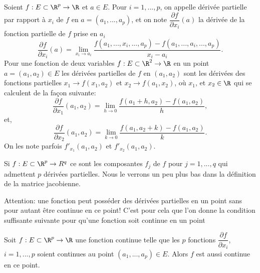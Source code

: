 \documentclass[class=report,crop=false]{standalone}
\begin{document}
\begin{definition}
\textcolor[rgb]{0.73,0.00,0.00}{
Soient $f: E \subset \R^p \rightarrow \R$ et $a \in E$. Pour $i=1,...,p$, 
on appelle dérivée partielle par rapport à $x_i$ de $f$ en $a=(a_1, ..., a_p)$, et on note
$\dfrac{\partial f}{\partial x_i}(a)$ la dérivée de la fonction partielle de $f$ prise en $a_i$
\begin{equation*}
\dfrac{\partial f}{ \partial x_i }(a)= \displaystyle \lim_{x_i \rightarrow a_i} \dfrac{f(a_1, ..., x_i,...,a_p)-f(a_1,...,a_i,...,a_p)}{x_i-a_i}.
\end{equation*}
Pour une fonction de deux variables $f:E \subset \R^2 \rightarrow \R$ en un point $a=(a_1,a_2) \in E$
les dérivées partielles de $f$ en $(a_1,a_2)$ sont les dérivées des fonctions partielles 
$x_1 \rightarrow f(x_1,a_2)$ et $x_2 \rightarrow f(a_1,x_2)$, où $x_1$, et $x_2 \in \R$ qui se calculent de la façon suivante:
\begin{equation*}
\dfrac{\partial f}{ \partial x_1 }(a_1,a_2)= \displaystyle \lim_{h \rightarrow 0} \dfrac{f(a_1+h,a_2)-f(a_1,a_2)}{h},
\end{equation*} et, 
\begin{equation*}
\dfrac{\partial f}{ \partial x_2 }(a_1,a_2)= \displaystyle \lim_{k \rightarrow 0} \dfrac{f(a_1,a_2+k)-f(a_1,a_2)}{k} .
\end{equation*}
On les note parfois $f'_{x_1}(a_1,a_2)$ et $f'_{x_2}(a_1,a_2)$.
}
 \end{definition}
 
  \begin{remarque*}
\textcolor[rgb]{0.00,0.00,1.00}{
\noindent 
Si $f: E \subset \R^p \rightarrow \\R^q$ ce sont les composantes $f_j$ de $f$ pour $j=1,...,q$ qui admettent $p$ dérivées partielles.
Nous le verrons un peu plus bas dans la définition de la matrice jacobienne.
}
\end{remarque*}
 
 \begin{remarque*}
\textcolor[rgb]{0.00,0.00,1.00}{
\noindent 
Attention: une fonction peut posséder des dérivées partielles en un point sans pour autant être 
continue en ce point! C'est pour cela que l'on donne la condition suffisante suivante pour qu'une 
fonction soit continue en un point
}
\end{remarque*}

\begin{theoreme}
\textcolor[rgb]{0.50,0.00,0.25}{ 
Soit $f: E \subset \R^p \rightarrow \R$ une fonction continue telle que les $p$ fonctions
$\dfrac{\partial f}{\partial x_i}$, $i=1,...,p$ soient continues au point $(a_1,...,a_p) \in E$.
Alors $f$ est aussi continue en ce point.
}
\end{theoreme}
\end{document}
